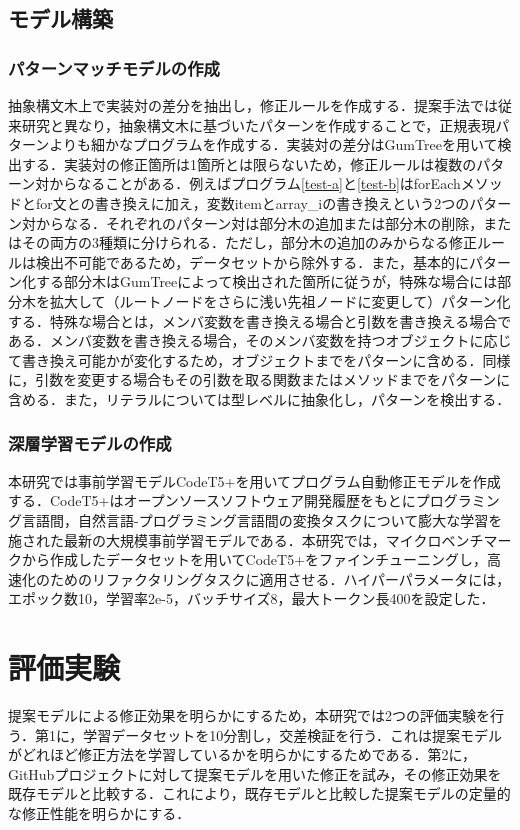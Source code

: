 \documentclass[T,J]{fose} %
\begin{document}
\subsection{モデル構築}
\subsubsection{パターンマッチモデルの作成}
抽象構文木上で実装対の差分を抽出し，修正ルールを作成する．提案手法では従来研究と異なり，抽象構文木に基づいたパターンを作成することで，正規表現パターンよりも細かなプログラムを作成する．実装対の差分はGumTreeを用いて検出する．実装対の修正箇所は1箇所とは限らないため，修正ルールは複数のパターン対からなることがある．例えばプログラム\ref{test-a}と\ref{test-b}はforEachメソッドとfor文との書き換えに加え，変数itemとarray\_iの書き換えという2つのパターン対からなる．それぞれのパターン対は部分木の追加または部分木の削除，またはその両方の3種類に分けられる．ただし，部分木の追加のみからなる修正ルールは検出不可能であるため，データセットから除外する．また，基本的にパターン化する部分木はGumTreeによって検出された箇所に従うが，特殊な場合には部分木を拡大して（ルートノードをさらに浅い先祖ノードに変更して）パターン化する．特殊な場合とは，メンバ変数を書き換える場合と引数を書き換える場合である．メンバ変数を書き換える場合，そのメンバ変数を持つオブジェクトに応じて書き換え可能かが変化するため，オブジェクトまでをパターンに含める．同様に，引数を変更する場合もその引数を取る関数またはメソッドまでをパターンに含める．また，リテラルについては型レベルに抽象化し，パターンを検出する．


\subsubsection{深層学習モデルの作成}
本研究では事前学習モデルCodeT5+を用いてプログラム自動修正モデルを作成する．CodeT5+はオープンソースソフトウェア開発履歴をもとにプログラミング言語間，自然言語-プログラミング言語間の変換タスクについて膨大な学習を施された最新の大規模事前学習モデルである．本研究では，マイクロベンチマークから作成したデータセットを用いてCodeT5+をファインチューニングし，高速化のためのリファクタリングタスクに適用させる．ハイパーパラメータには，エポック数10，学習率2e-5，バッチサイズ8，最大トークン長400を設定した．



\section{評価実験}
提案モデルによる修正効果を明らかにするため，本研究では2つの評価実験を行う．第1に，学習データセットを10分割し，交差検証を行う．これは提案モデルがどれほど修正方法を学習しているかを明らかにするためである．第2に，GitHubプロジェクトに対して提案モデルを用いた修正を試み，その修正効果を既存モデルと比較する．これにより，既存モデルと比較した提案モデルの定量的な修正性能を明らかにする．
\end{document}
